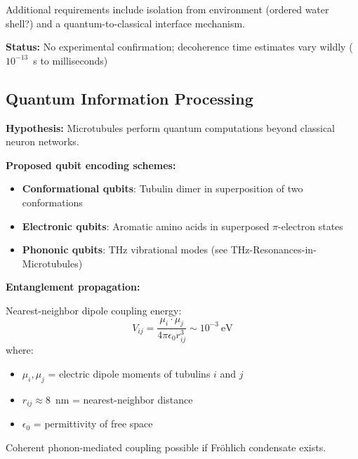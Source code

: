 Additional requirements include isolation from environment (ordered water shell?) and a quantum-to-classical interface mechanism.

\textbf{Status:} No experimental confirmation; decoherence time estimates vary wildly ($10^{-13}$~s to milliseconds)


\subsection{Quantum Information Processing}

\textbf{Hypothesis:} Microtubules perform quantum computations beyond classical neuron networks.

\textbf{Proposed qubit encoding schemes:}
\begin{itemize}
\item \textbf{Conformational qubits}: Tubulin dimer in superposition of two conformations
\item \textbf{Electronic qubits}: Aromatic amino acids in superposed $\pi$-electron states
\item \textbf{Phononic qubits}: THz vibrational modes (see THz-Resonances-in-Microtubules)
\end{itemize}

\textbf{Entanglement propagation:}

Nearest-neighbor dipole coupling energy:
\begin{equation}
V_{ij} = \frac{\mu_i \cdot \mu_j}{4\pi\epsilon_0 r_{ij}^3} \sim 10^{-3}\ \mathrm{eV}
\end{equation}
where:
\begin{itemize}
\item $\mu_i, \mu_j$ = electric dipole moments of tubulins $i$ and $j$
\item $r_{ij} \approx 8$~nm = nearest-neighbor distance
\item $\epsilon_0$ = permittivity of free space
\end{itemize}

Coherent phonon-mediated coupling possible if Fröhlich condensate exists.

